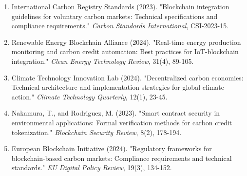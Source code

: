 \documentclass[oneside,a4paper,12pt]{book}
\begin{document}
\begin{enumerate}
    \item International Carbon Registry Standards (2023). "Blockchain integration guidelines for voluntary carbon markets: Technical specifications and compliance requirements." \textit{Carbon Standards International}, CSI-2023-15.

    \item Renewable Energy Blockchain Alliance (2024). "Real-time energy production monitoring and carbon credit automation: Best practices for IoT-blockchain integration." \textit{Clean Energy Technology Review}, 31(4), 89-105.

    \item Climate Technology Innovation Lab (2024). "Decentralized carbon economies: Technical architecture and implementation strategies for global climate action." \textit{Climate Technology Quarterly}, 12(1), 23-45.

    \item Nakamura, T., and Rodriguez, M. (2023). "Smart contract security in environmental applications: Formal verification methods for carbon credit tokenization." \textit{Blockchain Security Review}, 8(2), 178-194.

    \item European Blockchain Initiative (2024). "Regulatory frameworks for blockchain-based carbon markets: Compliance requirements and technical standards." \textit{EU Digital Policy Review}, 19(3), 134-152.
\end{enumerate}
\end{document}
